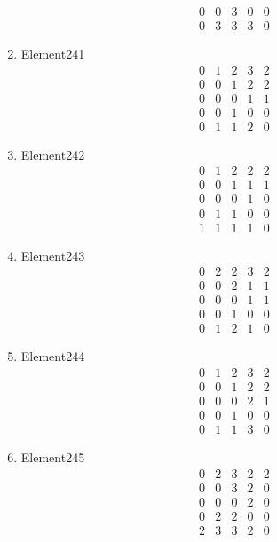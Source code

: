 \documentclass[12pt]{article}
\begin{document}
\begin{multicols}{3}
\begin{enumerate}
\begin{equation*}
\begin{array}{ccccc}
0&0&3&0&0\\
0&3&3&3&0
\end{array}
\end{equation*}
\item Element241
\begin{equation*}
\begin{array}{ccccc}
0&1&2&3&2\\
0&0&1&2&2\\
0&0&0&1&1\\
0&0&1&0&0\\
0&1&1&2&0
\end{array}
\end{equation*}
\item Element242
\begin{equation*}
\begin{array}{ccccc}
0&1&2&2&2\\
0&0&1&1&1\\
0&0&0&1&0\\
0&1&1&0&0\\
1&1&1&1&0
\end{array}
\end{equation*}
\item Element243
\begin{equation*}
\begin{array}{ccccc}
0&2&2&3&2\\
0&0&2&1&1\\
0&0&0&1&1\\
0&0&1&0&0\\
0&1&2&1&0
\end{array}
\end{equation*}
\item Element244
\begin{equation*}
\begin{array}{ccccc}
0&1&2&3&2\\
0&0&1&2&2\\
0&0&0&2&1\\
0&0&1&0&0\\
0&1&1&3&0
\end{array}
\end{equation*}
\item Element245
\begin{equation*}
\begin{array}{ccccc}
0&2&3&2&2\\
0&0&3&2&0\\
0&0&0&2&0\\
0&2&2&0&0\\
2&3&3&2&0
\end{array}

\end{equation*}
\end{enumerate}
\end{multicols}
\end{document}
